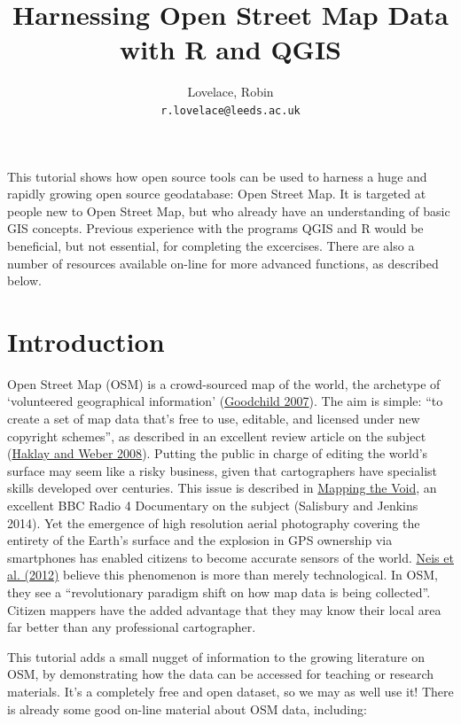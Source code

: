 \documentclass[]{article}
\author{
Lovelace, Robin\\
\texttt{r.lovelace@leeds.ac.uk}
}
\title{Harnessing Open Street Map Data with R and QGIS}
\begin{document}
\maketitle




This tutorial shows how open source tools can be used to harness a huge
and rapidly growing open source geodatabase: Open Street Map. It is
targeted at people new to Open Street Map, but who already have an
understanding of basic GIS concepts. Previous experience with the
programs QGIS and R would be beneficial, but not essential, for
completing the excercises. There are also a number of resources
available on-line for more advanced functions, as described below.

\section{Introduction}

Open Street Map (OSM) is a crowd-sourced map of the world, the archetype
of `volunteered geographical information'
(\href{http://www.ncgia.ucsb.edu/projects/vgi/docs/position/Goodchild\_VGI2007.pdf}{Goodchild
2007}). The aim is simple: ``to create a set of map data that's free to
use, editable, and licensed under new copyright schemes'', as described
in an excellent review article on the subject
(\href{http://discovery.ucl.ac.uk/13849/1/13849.pdf}{Haklay and Weber
2008}). Putting the public in charge of editing the world's surface may
seem like a risky business, given that cartographers have specialist
skills developed over centuries. This issue is described in
\href{https://dl.dropboxusercontent.com/u/15008199/egs2stay/Mapping\_the\_Void\_-\_Mapping\_the\_Void\_b03s6mf0\_default.m4a}{Mapping
the Void}, an excellent BBC Radio 4 Documentary on the subject
(Salisbury and Jenkins 2014). Yet the emergence of high resolution
aerial photography covering the entirety of the Earth's surface and the
explosion in GPS ownership via smartphones has enabled citizens to
become accurate sensors of the world.
\href{http://www.mdpi.com/1999-5903/4/1/1/pdf}{Neis et al. (2012)}
believe this phenomenon is more than merely technological. In OSM, they
see a ``revolutionary paradigm shift on how map data is being
collected''. Citizen mappers have the added advantage that they may know
their local area far better than any professional cartographer.

This tutorial adds a small nugget of information to the growing
literature on OSM, by demonstrating how the data can be accessed for
teaching or research materials. It's a completely free and open dataset,
so we may as well use it! There is already some good on-line material
about OSM data, including:
\end{document}

